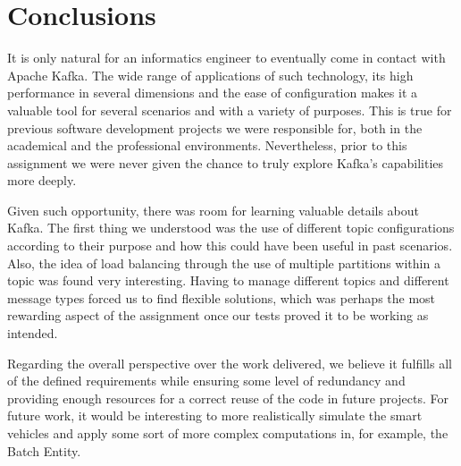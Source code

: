 \documentclass[12pt]{article}
\begin{document}
\newpage
\section*{Conclusions} %

It is only natural for an informatics engineer to eventually come in contact with Apache Kafka.
The wide range of applications of such technology, its high performance in several dimensions and the ease of configuration makes it a valuable tool for several
scenarios and with a variety of purposes.
This is true for previous software development projects we were responsible for, both in the academical and the professional environments.
Nevertheless, prior to this assignment we were never given the chance to truly explore Kafka's capabilities more deeply.

Given such opportunity, there was room for learning valuable details about Kafka.
The first thing we understood was the use of different topic configurations according to their purpose and how this could have been useful in past scenarios.
Also, the idea of load balancing through the use of multiple partitions within a topic was found very interesting.
Having to manage different topics and different message types forced us to find flexible solutions, which was perhaps the most rewarding aspect of the 
assignment once our tests proved it to be working as intended.

Regarding the overall perspective over the work delivered, we believe it fulfills all of the defined requirements while ensuring some level of redundancy and 
providing enough resources for a correct reuse of the code in future projects.
For future work, it would be interesting to more realistically simulate the smart vehicles and apply some sort of more complex computations in, for example, the 
Batch Entity. 
\end{document}

